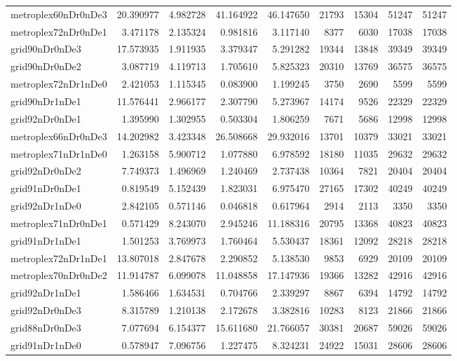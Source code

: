 \begin{longtable}{|l|r|r|r|r|r|r|r|r|}
metroplex60nDr0nDe3 & 20.390977 & 4.982728 & 41.164922 & 46.147650 & 21793 & 15304 & 51247 & 51247 \\
metroplex72nDr0nDe1 & 3.471178 & 2.135324 & 0.981816 & 3.117140 & 8377 & 6030 & 17038 & 17038 \\
grid90nDr0nDe3 & 17.573935 & 1.911935 & 3.379347 & 5.291282 & 19344 & 13848 & 39349 & 39349 \\
grid90nDr0nDe2 & 3.087719 & 4.119713 & 1.705610 & 5.825323 & 20310 & 13769 & 36575 & 36575 \\
metroplex72nDr1nDe0 & 2.421053 & 1.115345 & 0.083900 & 1.199245 & 3750 & 2690 & 5599 & 5599 \\
grid90nDr1nDe1 & 11.576441 & 2.966177 & 2.307790 & 5.273967 & 14174 & 9526 & 22329 & 22329 \\
grid92nDr0nDe1 & 1.395990 & 1.302955 & 0.503304 & 1.806259 & 7671 & 5686 & 12998 & 12998 \\
metroplex66nDr0nDe3 & 14.202982 & 3.423348 & 26.508668 & 29.932016 & 13701 & 10379 & 33021 & 33021 \\
metroplex71nDr1nDe0 & 1.263158 & 5.900712 & 1.077880 & 6.978592 & 18180 & 11035 & 29632 & 29632 \\
grid92nDr0nDe2 & 7.749373 & 1.496969 & 1.240469 & 2.737438 & 10364 & 7821 & 20404 & 20404 \\
grid91nDr0nDe1 & 0.819549 & 5.152439 & 1.823031 & 6.975470 & 27165 & 17302 & 40249 & 40249 \\
grid92nDr1nDe0 & 2.842105 & 0.571146 & 0.046818 & 0.617964 & 2914 & 2113 & 3350 & 3350 \\
metroplex71nDr0nDe1 & 0.571429 & 8.243070 & 2.945246 & 11.188316 & 20795 & 13368 & 40823 & 40823 \\
grid91nDr1nDe1 & 1.501253 & 3.769973 & 1.760464 & 5.530437 & 18361 & 12092 & 28218 & 28218 \\
metroplex72nDr1nDe1 & 13.807018 & 2.847678 & 2.290852 & 5.138530 & 9853 & 6929 & 20109 & 20109 \\
metroplex70nDr0nDe2 & 11.914787 & 6.099078 & 11.048858 & 17.147936 & 19366 & 13282 & 42916 & 42916 \\
grid92nDr1nDe1 & 1.586466 & 1.634531 & 0.704766 & 2.339297 & 8867 & 6394 & 14792 & 14792 \\
grid92nDr0nDe3 & 8.315789 & 1.210138 & 2.172678 & 3.382816 & 10283 & 8123 & 21866 & 21866 \\
grid88nDr0nDe3 & 7.077694 & 6.154377 & 15.611680 & 21.766057 & 30381 & 20687 & 59026 & 59026 \\
grid91nDr1nDe0 & 0.578947 & 7.096756 & 1.227475 & 8.324231 & 24922 & 15031 & 28606 & 28606 \\

\end{longtable}
